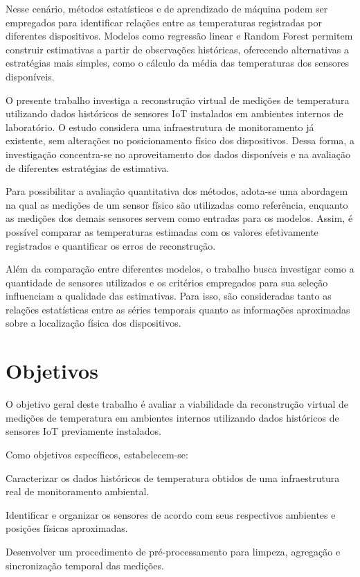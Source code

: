 Nesse cenário, métodos estatísticos e de aprendizado de máquina podem ser empregados para identificar relações entre as temperaturas registradas por diferentes dispositivos. Modelos como regressão linear e Random Forest permitem construir estimativas a partir de observações históricas, oferecendo alternativas a estratégias mais simples, como o cálculo da média das temperaturas dos sensores disponíveis.

O presente trabalho investiga a reconstrução virtual de medições de temperatura utilizando dados históricos de sensores IoT instalados em ambientes internos de laboratório. O estudo considera uma infraestrutura de monitoramento já existente, sem alterações no posicionamento físico dos dispositivos. Dessa forma, a investigação concentra-se no aproveitamento dos dados disponíveis e na avaliação de diferentes estratégias de estimativa.

Para possibilitar a avaliação quantitativa dos métodos, adota-se uma abordagem na qual as medições de um sensor físico são utilizadas como referência, enquanto as medições dos demais sensores servem como entradas para os modelos. Assim, é possível comparar as temperaturas estimadas com os valores efetivamente registrados e quantificar os erros de reconstrução.

Além da comparação entre diferentes modelos, o trabalho busca investigar como a quantidade de sensores utilizados e os critérios empregados para sua seleção influenciam a qualidade das estimativas. Para isso, são consideradas tanto as relações estatísticas entre as séries temporais quanto as informações aproximadas sobre a localização física dos dispositivos.

\section{Objetivos}
O objetivo geral deste trabalho é avaliar a viabilidade da reconstrução virtual de medições de temperatura em ambientes internos utilizando dados históricos de sensores IoT previamente instalados.

Como objetivos específicos, estabelecem-se:

Caracterizar os dados históricos de temperatura obtidos de uma infraestrutura real de monitoramento ambiental.

Identificar e organizar os sensores de acordo com seus respectivos ambientes e posições físicas aproximadas.

Desenvolver um procedimento de pré-processamento para limpeza, agregação e sincronização temporal das medições.

